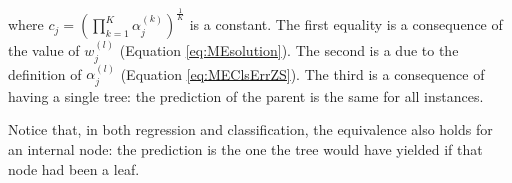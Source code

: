\documentclass{article}
\begin{document}
where $c_j = \left(\prod_{k=1}^K \alpha_j^{(k)}\right)^{\frac{1}{K}}$ is a 
constant. The first equality is a consequence of the value of $w_j^{(l)}$ 
(Equation \ref{eq:MEsolution}). The second is a due to the definition of 
$\alpha_j^{(l)}$ (Equation \ref{eq:MEClsErrZS}). The third is a consequence of 
having a single tree: the prediction of the parent is the same for all 
instances.





Notice that, in both regression and classification, the equivalence also holds 
for an internal node: the prediction is the one the tree would have yielded if 
that node had been a leaf.




\end{document}
